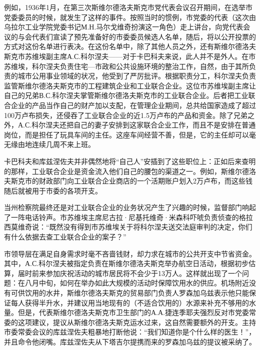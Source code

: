 例如，1936年1月，在第三次斯维尔德洛夫斯克市党代表会议召开期间，在选举市党委委员的时候，就发生了这样的事件。按照当时的惯例，市党委的代表（这次由乌拉尔工业学院党委书记М.Н.马尔戈维奇扮演这一角色）走上讲台，向党代表会议的与会代表们宣读了预先准备好的市委委员候选人名单，随后，将以公开投票的方式对这份名单进行表决。在这份名单中，除了其他人员之外，还有斯维尔德洛夫斯克市苏维埃副主席А.С.科尔涅夫——对于卡巴科夫来说，此人并不是外人。在市苏维埃，科尔涅夫负责住宅—市政和公共设施环境的整治工作，自然，由于其所负责的城市公用事业领域的状况，他受到了严厉批评。根据职责分工，科尔涅夫负责监管斯维尔德洛夫斯克市的工程建筑企业和工业联合企业。这位市苏维埃副主席让自己的兄弟В.С.科尔涅夫掌管斯维尔德洛夫斯克市的工业联合企业。后者把工业联合企业的产品当作自己的财产加以支配，在管理企业期间，总共给国家造成了超过100万卢布损失，还侵吞了工业联合企业的近1.5万卢布的产品和资金。除了兄弟之外，А.С.科尔涅夫还把自己的妻子安排到这家联合企业工作，而且不是安排在普通岗位，而是担任了玩具车间的主任。这座车间经营不善，但是，它的主任却可以毫无缘由地连续几周不来上班。

卡巴科夫和库兹涅佐夫并非偶然地将“自己人”安插到了这些职位上：正如后来查明的那样，工业联合企业是资金流入他们自己的腰包的渠道之一。例如，斯维尔德洛夫斯克市的财政部门向工业联合企业商店的一个活期账户划入2万卢布，而这些钱随后就被用于市委的各项开支。

当州检察院最终还是对工业联合企业的业务状况产生了兴趣的时候，监督部门响起了一阵电话铃声。市苏维埃主席尼古拉·尼基托维奇·米森科吓唬负责侦查的格拉西莫维奇说：“既然没有得到市苏维埃关于将科尔涅夫送交法庭审判的决定，你们有什么依据去查工业联合企业的案子？”

市领导层在满足自身需求时毫不吝啬钱财，却力求在城市的公共开支中节省资金。其中，А.С.科尔涅夫被指定负责在斯维尔德洛夫斯克举办航空日活动，根据初步估算，届时前来参加庆祝活动的城市居民将不会少于13万人。这样就出现了一个问题：在八月中旬，如何在举办如此大规模的活动时保障饮用水的供应。机场附近没有可供饮用的水井，斯维尔德洛夫斯克的贸易部门负责人罗森加乌兹表示他只能保证每人获得半升水，并建议用当地现有的（不适合饮用的）水源来补充不够用的水量。但是，代表斯维尔德洛夫斯克市卫生部门的А.А.捷连季耶夫强烈反对市党委常委的这项建议，提议从斯维尔德洛夫斯克运水过来，这自然需要额外的开支。主持市委常委会议的库兹涅佐夫粗暴地打断他说：“我们知道你是个什么样的医生！”，并且命令他闭嘴。库兹涅佐夫从下塔吉尔提携而来的罗森加乌兹的提议被采纳了。

